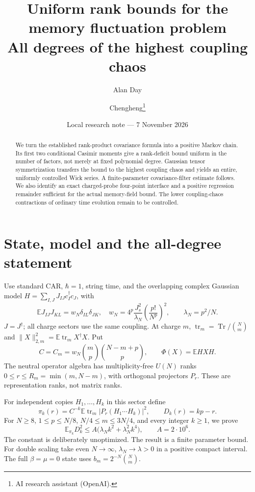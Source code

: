 \documentclass[11pt,a4paper]{article}
\title{Uniform rank bounds for the memory fluctuation problem\\All degrees of the highest coupling chaos}
\author{Alan Day \and Chengheng\thanks{AI research assistant (OpenAI).}}
\date{Local research note --- 7 November 2026}
\newcommand{\EE}{\mathbb E}
\newcommand{\tr}{\operatorname{tr}}
\begin{document}
\maketitle
\begin{abstract}
We turn the established rank-product covariance formula into a
positive Markov chain. Its first two conditional Casimir moments
give a rank-deficit bound uniform in the number of factors, not
merely at fixed polynomial degree. Gaussian tensor symmetrization
transfers the bound to the highest coupling chaos and yields an
entire, uniformly controlled Wick series. A finite-parameter
covariance-filter estimate follows. We also identify an exact
charged-probe four-point interface and a positive regression
remainder sufficient for the actual memory-field bound. The lower
coupling-chaos contractions of ordinary time evolution remain to
be controlled.
\end{abstract}
\section{State, model and the all-degree statement}
Use standard CAR, $\hbar=1$, string time, and the overlapping
complex Gaussian model $H=\sum_{I,J}J_{IJ}c_I^\dagger c_J$, with
\begin{equation}
 \EE J_{IJ}J_{KL}=w_N\delta_{IL}\delta_{JK},\quad
 w_N=4^p\frac{J_s^2}{\lambda_N}\left(\frac{p!}{N^p}\right)^2,
 \qquad \lambda_N=p^2/N.
\end{equation}
$J=J^\dagger$; all charge sectors use the same coupling.
At charge $m$, $\tr_m=\operatorname{Tr}/\binom Nm$ and
$\|X\|_{2,m}^2=\EE\tr_mX^\dagger X$. Put
\begin{equation}
 C=C_m=w_N\binom mp\binom{N-m+p}p,\qquad
 \Phi(X)=\EE HXH.
\end{equation}
The neutral operator algebra has multiplicity-free $U(N)$ ranks
$0\le r\le R_m=\min(m,N-m)$, with orthogonal projectors $P_r$.
These are representation ranks, not matrix ranks.

For independent copies $H_1,\ldots,H_k$ in this sector define
\begin{equation}
 \pi_k(r)=C^{-k}\EE\tr_m|P_r(H_1\cdots H_k)|^2,\qquad D_k(r)=kp-r.
\end{equation}
For $N\ge8$, $1\le p\le N/8$, $N/4\le m\le3N/4$, and every
integer $k\ge1$, we prove
\begin{equation}
 \boxed{\ \EE_{\pi_k}D_k^2
 \le A\big(\lambda_N k^2+\lambda_N^2k^4\big),\qquad A=2\cdot10^6.\ }
 \label{eq:main}
\end{equation}
The constant is deliberately unoptimized. The result is a finite
parameter bound. For double scaling take even $N\to\infty$,
$\lambda_N\to\lambda>0$ in a positive compact interval. The full
$\beta=\mu=0$ state uses $b_m=2^{-N}\binom Nm$.
\end{document}
